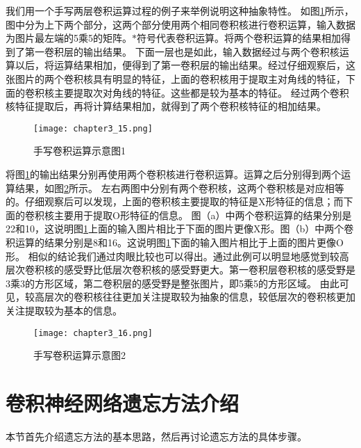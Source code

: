 我们用一个手写两层卷积运算过程的例子来举例说明这种抽象特性。
如图\ref{fig:chapter3_15}所示，图中分为上下两个部分，这两个部分使用两个相同卷积核进行卷积运算，输入数据为图片最左端的5乘5的矩阵。$\ast$符号代表卷积运算。将两个卷积运算的结果相加得到了第一卷积层的输出结果。
下面一层也是如此，输入数据经过与两个卷积核运算以后，将运算结果相加，便得到了第一卷积层的输出结果。经过仔细观察后，这张图片的两个卷积核具有明显的特征，上面的卷积核用于提取主对角线的特征，下面的卷积核主要提取次对角线的特征。这些都是较为基本的特征。
经过两个卷积核特征提取后，再将计算结果相加，就得到了两个卷积核特征的相加结果。
\begin{figure}
    \centering
    \texttt{[image: chapter3\_15.png]}
    \caption{手写卷积运算示意图1}
    \label{fig:chapter3_15}
\end{figure}

将图\ref{fig:chapter3_15}的输出结果分别再使用两个卷积核进行卷积运算。运算之后分别得到两个运算结果，如图\ref{fig:chapter3_16}所示。
左右两图中分别有两个卷积核，这两个卷积核是对应相等的。仔细观察后可以发现，上面的卷积核主要提取的特征是X形特征的信息；而下面的卷积核主要用于提取O形特征的信息。
图（a）中两个卷积运算的结果分别是22和10，这说明图\ref{fig:chapter3_15}上面的输入图片相比于下面的图片更像X形。图（b）中两个卷积运算的结果分别是8和16。这说明图\ref{fig:chapter3_15}下面的输入图片相比于上面的图片更像O形。
相似的结论我们通过肉眼比较也可以得出。通过此例可以明显地感觉到较高层次卷积核的感受野比低层次卷积核的感受野更大。第一卷积层卷积核的感受野是3乘3的方形区域，第二卷积层的感受野是整张图片，即5乘5的方形区域。
由此可见，较高层次的卷积核往往更加关注提取较为抽象的信息，较低层次的卷积核更加关注提取较为基本的信息。
\begin{figure}
    \centering
    \texttt{[image: chapter3\_16.png]}
    \caption{手写卷积运算示意图2}
    \label{fig:chapter3_16}
\end{figure}

\section{卷积神经网络遗忘方法介绍}
本节首先介绍遗忘方法的基本思路，然后再讨论遗忘方法的具体步骤。
